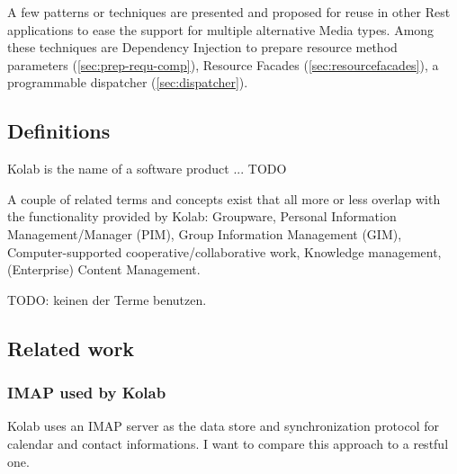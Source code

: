 \documentclass[12pt,a4paper]{scrartcl}		%
\begin{document}
A few patterns or techniques are presented and proposed for reuse in other Rest
applications to ease the support for multiple alternative Media types. Among
these techniques are Dependency Injection to prepare resource method parameters
(\autoref{sec:prep-requ-comp}), Resource Facades
  (\autoref{sec:resourcefacades}), a programmable dispatcher
  (\autoref{sec:dispatcher}).

\subsection{Definitions}

Kolab is the name of a software product ... TODO

A couple of related terms and concepts exist that all more or less overlap with
the functionality provided by Kolab: Groupware, Personal Information
Management/Manager (PIM), Group Information Management (GIM), Computer-supported
cooperative/collaborative work, Knowledge management, (Enterprise) Content
Management.

TODO: keinen der Terme benutzen.

\subsection{Related work}
\subsubsection{IMAP used by Kolab}

Kolab uses an IMAP server as the data store and
synchronization protocol for calendar and contact informations. I want to
compare this approach to a restful one.
\end{document}
